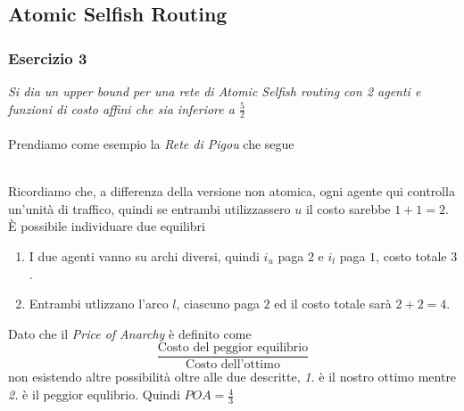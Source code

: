 \documentclass{article}
\begin{document}
        \subsection{Atomic Selfish Routing}
            \subsubsection{Esercizio 3}
                \textit{Si dia un upper bound per una rete di Atomic Selfish routing con 2 agenti e funzioni di costo affini che sia inferiore a $ \frac{5}{2} $}\\
                \\
                Prendiamo come esempio la \textit{Rete di Pigou} che segue
                \begin{figure}[htb]\hspace*{\fill}%
                    \hspace*{\fill}
                \end{figure}\\
                Ricordiamo che, a differenza della versione non atomica, ogni agente qui controlla un'unità di traffico, quindi se entrambi utilizzassero $ u $ il costo sarebbe $ 1 + 1 = 2 $.\\
                È possibile individuare due equilibri
                \begin{enumerate}
                    \item I due agenti vanno su archi diversi, quindi $ i_u $ paga $ 2 $ e $ i_l $ paga $ 1 $, costo totale $ 3 $.
                    \item Entrambi utlizzano l'arco $ l $, ciascuno paga $ 2 $ ed il costo totale sarà $ 2 + 2 = 4 $.
                \end{enumerate}
                Dato che il \textit{Price of Anarchy} è definito come
                \[
                    \frac{\text{Costo del peggior equilibrio}}{\text{Costo dell'ottimo}}    
                \]
                non esistendo altre possibilità oltre alle due descritte, \textit{1.} è il nostro ottimo mentre \textit{2.} è il peggior equlibrio. Quindi $ POA = \frac{4}{3} $
            \newpage
\end{document}
